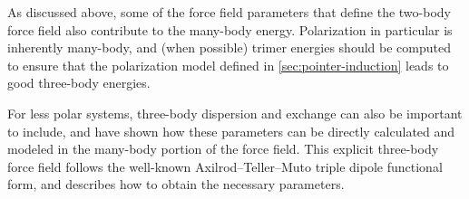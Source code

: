 As discussed above, some of the force field parameters that define the
two-body force field also contribute to the many-body energy. Polarization in
particular is inherently many-body, and (when possible) trimer energies should
be computed to ensure that the polarization model defined in
\cref{sec:pointer-induction} leads to good three-body energies.

For less polar systems, three-body dispersion and exchange can also be
important to include, and \citet{McDaniel2014} have shown how these
parameters can be directly calculated and modeled in the many-body
portion of the force field. This explicit three-body force field follows the
well-known Axilrod--Teller--Muto triple dipole functional form, and
 describes how to obtain the necessary parameters. 
